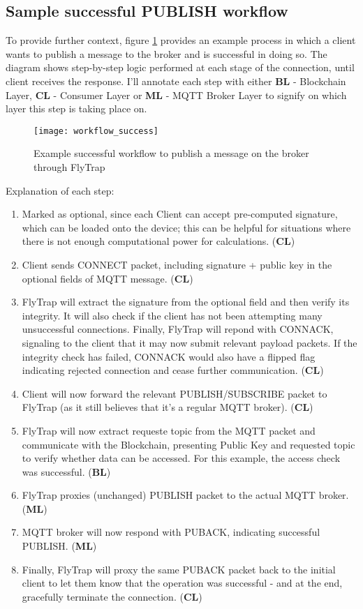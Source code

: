 \subsection{Sample successful PUBLISH workflow}
To provide further context, figure \ref{fig:workflow_success} provides an example process in which a client wants to publish a message to the broker and is successful in doing so. The diagram shows step-by-step logic performed at each stage of the connection, until client receives the response. I'll annotate each step with either \textbf{BL} - Blockchain Layer, \textbf{CL} - Consumer Layer or \textbf{ML} - MQTT Broker Layer to signify on which layer this step is taking place on.
\begin{figure}[h]
    \centering
    \texttt{[image: workflow\_success]}
    \caption{Example successful workflow to publish a message on the broker through FlyTrap}
    \label{fig:workflow_success}
\end{figure}

Explanation of each step:
\begin{enumerate}\addtocounter{enumi}{-1}
    \item Marked as optional, since each Client can accept pre-computed signature, which can be loaded onto the device; this can be helpful for situations where there is not enough computational power for calculations. (\textbf{CL})
    \item Client sends CONNECT packet, including signature + public key in the optional fields of MQTT message. (\textbf{CL})
    \item FlyTrap will extract the signature from the optional field and then verify its integrity. It will also check if the client has not been attempting many unsuccessful connections. Finally, FlyTrap will repond with CONNACK, signaling to the client that it may now submit relevant payload packets. If the integrity check has failed, CONNACK would also have a flipped flag indicating rejected connection and cease further communication. (\textbf{CL})
    \item Client will now forward the relevant PUBLISH/SUBSCRIBE packet to FlyTrap (as it still believes that it's a regular MQTT broker). (\textbf{CL})
    \item FlyTrap will now extract requeste topic from the MQTT packet and communicate with the Blockchain, presenting Public Key and requested topic to verify whether data can be accessed. For this example, the access check was successful. (\textbf{BL})
    \item FlyTrap proxies (unchanged) PUBLISH packet to the actual MQTT broker. (\textbf{ML})
    \item MQTT broker will now respond with PUBACK, indicating successful PUBLISH. (\textbf{ML})
    \item Finally, FlyTrap will proxy the same PUBACK packet back to the initial client to let them know that the operation was successful - and at the end, gracefully terminate the connection. (\textbf{CL})
\end{enumerate}

